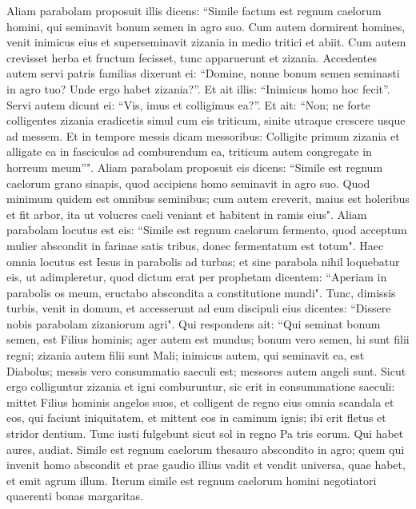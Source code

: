 \begin{biblechapter}
\verse Aliam parabolam proposuit illis dicens: “Simile factum est regnum caelorum homini, qui seminavit bonum semen in agro suo. 
\verse Cum autem dormirent homines, venit inimicus eius et superseminavit zizania in medio tritici et abiit. 
\verse Cum autem crevisset herba et fructum fecisset, tunc apparuerunt et zizania. 
\verse Accedentes autem servi patris familias dixerunt ei: “Domine, nonne bonum semen seminasti in agro tuo? Unde ergo habet zizania?”. 
\verse Et ait illis: “Inimicus homo hoc fecit”. Servi autem dicunt ei: “Vis, imus et colligimus ea?”. 
\verse Et ait: “Non; ne forte colligentes zizania eradicetis simul cum eis triticum, 
\verse sinite utraque crescere usque ad messem. Et in tempore messis dicam messoribus: Colligite primum zizania et alligate ea in fasciculos ad comburendum ea, triticum autem congregate in horreum meum”". 
\verse Aliam parabolam proposuit eis dicens: “Simile est regnum caelorum grano sinapis, quod accipiens homo seminavit in agro suo. 
\verse Quod minimum quidem est omnibus seminibus; cum autem creverit, maius est holeribus et fit arbor, ita ut volucres caeli veniant et habitent in ramis eius". 
\verse Aliam parabolam locutus est eis: “Simile est regnum caelorum fermento, quod acceptum mulier abscondit in farinae satis tribus, donec fermentatum est totum". 
\verse Haec omnia locutus est Iesus in parabolis ad turbas; et sine parabola nihil loquebatur eis, 
\verse ut adimpleretur, quod dictum erat per prophetam dicentem: “Aperiam in parabolis os meum, eructabo abscondita a constitutione mundi". 
\verse Tunc, dimissis turbis, venit in domum, et accesserunt ad eum discipuli eius dicentes: “Dissere nobis parabolam zizaniorum agri". 
\verse Qui respondens ait: “Qui seminat bonum semen, est Filius hominis; 
\verse ager autem est mundus; bonum vero semen, hi sunt filii regni; zizania autem filii sunt Mali;  
\verse inimicus autem, qui seminavit ea, est Diabolus; messis vero consummatio saeculi est; messores autem angeli sunt. 
\verse Sicut ergo colliguntur zizania et igni comburuntur, sic erit in consummatione saeculi: 
\verse mittet Filius hominis angelos suos, et colligent de regno eius omnia scandala et eos, qui faciunt iniquitatem, 
\verse et mittent eos in caminum ignis; ibi erit fletus et stridor dentium.  
\verse Tunc iusti fulgebunt sicut sol in regno Pa tris eorum. Qui habet aures, audiat. 
\verse Simile est regnum caelorum thesauro abscondito in agro; quem qui invenit homo abscondit et prae gaudio illius vadit et vendit universa, quae habet, et emit agrum illum. 
\verse Iterum simile est regnum caelorum homini negotiatori quaerenti bonas margaritas. 

\end{biblechapter}
